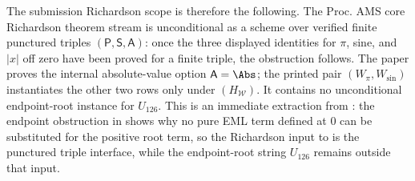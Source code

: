 The submission Richardson scope is therefore the following.  The Proc. AMS core
Richardson theorem stream is unconditional as a scheme over verified finite
punctured triples \((\mathsf P,\mathsf S,\mathsf A)\): once the three displayed
identities for \(\pi\), sine, and \(|x|\) off zero have been proved for a finite
triple, the obstruction follows.  The paper proves the internal absolute-value
option \(\mathsf A=\Abs\); the printed pair \((W_{\pi},W_{\sin})\) instantiates the
other two rows only under \((H_{\mathcal W})\).  It contains no unconditional
endpoint-root instance for \(U_{126}\).  This is an immediate extraction from
: the endpoint obstruction in
 shows why no pure EML term defined at \(0\) can be
substituted for the positive root term, so the Richardson input to
 is the punctured triple
interface, while the endpoint-root string \(U_{126}\) remains outside that input.

